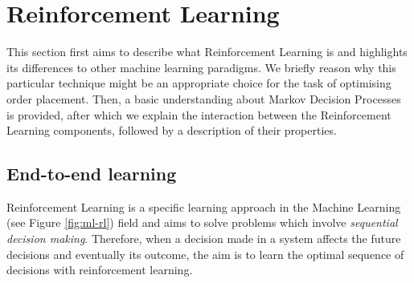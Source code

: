 \section{Reinforcement Learning}

This section first aims to describe what Reinforcement Learning is and highlights its differences to other machine learning paradigms. 
We briefly reason why this particular technique might be an appropriate choice for the task of optimising order placement. 
Then, a basic understanding about Markov Decision Processes is provided, after which we explain the interaction between the Reinforcement Learning components, followed by a description of their properties.

\subsection{End-to-end learning}

Reinforcement Learning is a specific learning approach in the Machine Learning (see Figure \ref{fig:ml-rl}) field and aims to solve problems which involve \textit{sequential decision making}.
Therefore, when a decision made in a system affects the future decisions and eventually its outcome, the aim is to learn the optimal sequence of decisions with reinforcement learning.

